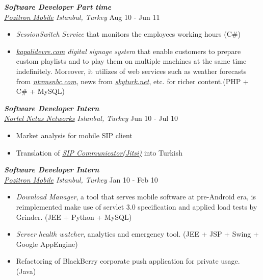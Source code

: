 \documentclass[line, margin]{res}
\begin{document}
\begin{resume}
	{\sl \textbf{Software Developer Part time} \\ \href{http://www.pozitron.com/}{Pozitron Mobile} Istanbul, Turkey} \hfill Aug 10 - Jun 11 \\
	\vspace{-0.3cm}
	\begin{itemize} \itemsep -2pt
		\item \textit{SessionSwitch Service} that monitors the employees working hours (C\#) 
		\item \textit{\href{http://kapalidevre.com}{kapalidevre.com} digital signage system} that enable customers to prepare custom playlists and to play them on multiple machines at the same time indefinitely. Moreover, it utilizes of web services such as weather forecasts from \textit{\href{http://www.ntvmsnbc.com/}{ntvmsnbc.com}}, news from \textit{\href{http://skyturk.net/}{skyturk.net}}, etc. for richer content.(PHP + C\# + MySQL)
	\end{itemize}

	{\sl \textbf{Software Developer Intern} \\ \href{http://en.netas.com.tr/default.aspx}{Nortel Netas Networks} Istanbul, Turkey} \hfill Jun 10 - Jul 10 \\
	\vspace{-0.3cm}
	\begin{itemize} \itemsep -2pt
		\item Market analysis for mobile SIP client
		\item Translation of \textit{\href{https://jitsi.org/}{SIP Communicator(Jitsi)}} into Turkish 
	\end{itemize}

	{\sl \textbf{Software Developer Intern} \\ \href{http://www.pozitron.com/}{Pozitron Mobile} Istanbul, Turkey} \hfill Jan 10 - Feb 10 \\
	\vspace{-0.3cm}
	\begin{itemize} \itemsep -2pt
		\item \textit{Download Manager}, a tool that serves mobile software at pre-Android era, is reimplemented make use of servlet 3.0 specification and applied load tests by Grinder. (JEE + Python + MySQL)
		\item \textit{Server health watcher}, analytics and emergency tool. (JEE + JSP + Swing + Google AppEngine)
		\item Refactoring of BlackBerry corporate push application for private usage. (Java)
	\end{itemize}							


\end{resume}
\end{document}
